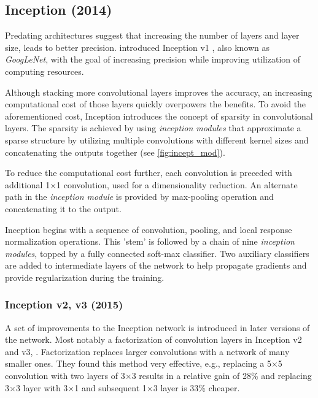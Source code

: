 \subsection{Inception (2014)}
\label{sec:inception}
Predating architectures suggest that increasing the number of layers and layer size, leads to better precision. \citeauthor{bib:googlenet} introduced Inception v1 \cite{bib:googlenet}, also known as \textit{GoogLeNet}, with the goal of increasing precision while improving utilization of computing resources.

Although stacking more convolutional layers improves the accuracy, an increasing computational cost of those layers quickly overpowers the benefits. To avoid the aforementioned cost, Inception introduces the concept of sparsity in convolutional layers. The sparsity is achieved by using \textit{inception modules} that approximate a sparse structure by utilizing multiple convolutions with different kernel sizes and concatenating the outputs together (see \cref{fig:incept_mod}). 

To reduce the computational cost further, each convolution is preceded with additional 1$\times$1 convolution, used for a dimensionality reduction. An alternate path in the \textit{inception module} is provided by max-pooling operation and concatenating it to the output.

Inception begins with a sequence of convolution, pooling, and local response normalization operations. This 'stem' is followed by a chain of nine \textit{inception modules}, topped by a fully connected soft-max classifier. Two auxiliary classifiers are added to intermediate layers of the network to help propagate gradients and provide regularization during the training.

\subsubsection{Inception v2, v3 (2015)}
A set of improvements to the Inception network is introduced in later versions of the network. Most notably a factorization of convolution layers in Inception v2 and v3, \citeauthor{bib:inception2} \cite{bib:inception2}. Factorization replaces larger convolutions with a network of many smaller ones. They found this method very effective, e.g., replacing a 5$\times$5 convolution with two layers of 3$\times$3 results in a relative gain of 28\% and replacing 3$\times$3 layer with 3$\times$1 and subsequent 1$\times$3 layer is 33\% cheaper.

